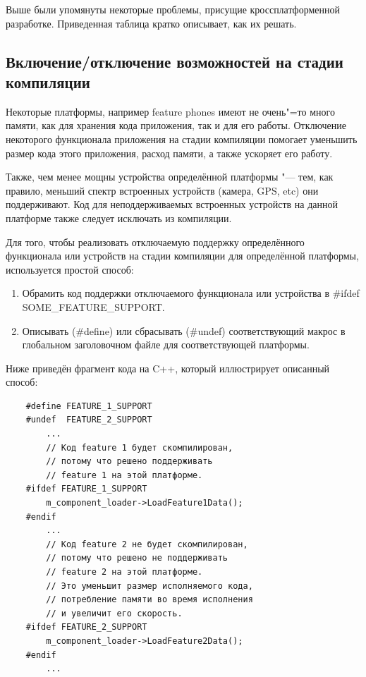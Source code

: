 \documentclass[10pt, a5paper]{article}
\begin{document}
Выше были упомянуты некоторые проблемы, присущие кроссплатформенной разработке. Приведенная таблица кратко описывает, как их решать.

\subsection*{Включение/отключение возможностей на стадии компиляции}

Некоторые платформы, например feature phones имеют не очень"=то много памяти, как для хранения кода приложения, так и для его работы. Отключение некоторого функционала приложения на стадии компиляции помогает уменьшить размер кода этого приложения, расход памяти, а также ускоряет его работу.

Также, чем менее мощны устройства определённой платформы "--- тем, как правило, меньший спектр встроенных устройств (камера, GPS, etc) они поддерживают. Код для неподдерживаемых встроенных устройств на данной платформе также следует исключать из компиляции.

Для того, чтобы реализовать отключаемую поддержку определённого функционала или устройств на стадии компиляции для определённой платформы, используется простой способ:

\begin{enumerate}
  \item Обрамить код поддержки отключаемого функционала или \linebreak устройства в \#ifdef SOME\_FEATURE\_SUPPORT.
  \item Описывать (\#define) или сбрасывать (\#undef) соответствующий макрос в глобальном заголовочном файле для соответствующей платформы.
\end{enumerate}

Ниже приведён фрагмент кода на C++, который иллюстрирует описанный способ:

\begin{verbatim}
    #define FEATURE_1_SUPPORT
    #undef  FEATURE_2_SUPPORT
        ...
        // Код feature 1 будет скомпилирован,
        // потому что решено поддерживать
        // feature 1 на этой платформе.
    #ifdef FEATURE_1_SUPPORT
        m_component_loader->LoadFeature1Data();
    #endif
        ...
        // Код feature 2 не будет скомпилирован,
        // потому что решено не поддерживать
        // feature 2 на этой платформе.
        // Это уменьшит размер исполняемого кода,
        // потребление памяти во время исполнения
        // и увеличит его скорость.
    #ifdef FEATURE_2_SUPPORT
        m_component_loader->LoadFeature2Data();
    #endif
        ...\end{verbatim}
\end{document}
